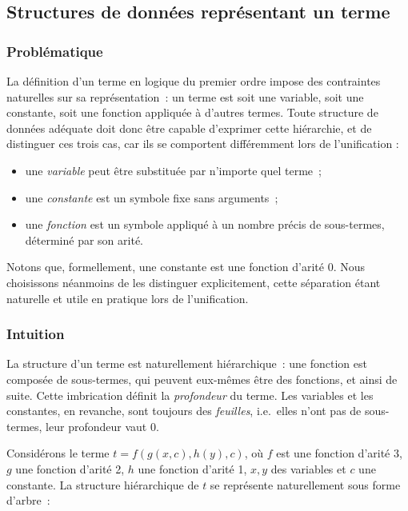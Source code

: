 \documentclass[11pt]{article}
\begin{document}
\subsection{Structures de données représentant un terme}
\subsubsection{Problématique}
La définition d'un terme en logique du premier ordre impose des contraintes 
naturelles sur sa représentation~: un terme est soit une variable, soit une 
constante, soit une fonction appliquée à d'autres termes. Toute structure de 
données adéquate doit donc être capable d'exprimer cette hiérarchie, et de 
distinguer ces trois cas, car ils se comportent différemment lors de 
l'unification :

\begin{itemize}
    \item une \textit{variable} peut être substituée par n'importe quel terme~;
    \item une \textit{constante} est un symbole fixe sans arguments~;
    \item une \textit{fonction} est un symbole appliqué à un nombre précis 
    de sous-termes, déterminé par son arité.
\end{itemize}

\vspace{0.2cm}
Notons que, formellement, une constante est une fonction d'arité $0$. Nous 
choisissons néanmoins de les distinguer explicitement, cette séparation étant 
naturelle et utile en pratique lors de l'unification.

\subsubsection{Intuition}
La structure d'un terme est naturellement hiérarchique~: une fonction est 
composée de sous-termes, qui peuvent eux-mêmes être des fonctions, et ainsi 
de suite. Cette imbrication définit la \textit{profondeur} du terme. Les 
variables et les constantes, en revanche, sont toujours des \textit{feuilles}, 
i.e.~elles n'ont pas de sous-termes, leur profondeur vaut $0$.

\vspace{0.2cm}
Considérons le terme $t = f(g(x, c), h(y), c)$, où $f$ est une 
fonction d'arité 3, $g$ une fonction d'arité 2, $h$ une 
fonction d'arité 1, $x, y$ des variables et $c$ une constante. 
La structure hiérarchique de $t$ se représente naturellement 
sous forme d'arbre~:
\end{document}
